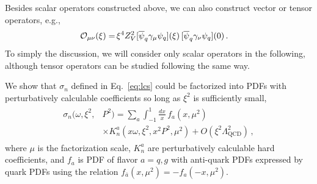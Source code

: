 \documentclass[twocolumn,aps,prl,superscriptaddress,nofootinbib,showpacs]{revtex4-1}
\newcommand{\sect}[1]{\noindent{\it \textbf{#1} ---}}
\begin{document}
Besides scalar operators constructed above, we can also construct vector or tensor operators, e.g.,
\begin{align}\label{eq:operatorsT}
{\cal O}_{\mu\nu}(\xi)=&\,\xi^4Z^{2}_V[\overline{\psi}_q\gamma_\mu{\psi}_{q}](\xi)\,[\overline{\psi}_{q}\gamma_\nu{\psi}_q](0)\,.
\end{align}
To simply the discussion, we will consider only scalar operators in the following, although tensor operators can be studied following the same way.

\sect{Factorization}
We show that ${\sigma}_{n}$ defined in Eq.~\eqref{eq:lcs} could be factorized into PDFs with perturbatively calculable coefficients so long as $\xi^2$ is sufficiently small,
 \begin{align}\label{eq:fac}
\begin{split}
{\sigma}_{n}(\omega,\xi^2,&P^2)=\sum_{a}\int_{-1}^1 \frac{dx}{x}\, f_{a}(x,\mu^2) \\
&\times K_{{n}}^{a}(x\omega,\xi^2,x^2P^2,\mu^2) +O(\xi^2\Lambda_{\text{QCD}}^2)\, ,
 \end{split}
\end{align}
where $\mu$ is the factorization scale, $K_n^{a}$ are perturbatively calculable hard coefficients, and $f_{a}$ is PDF of flavor $a=q,g$ with anti-quark PDFs expressed by quark PDFs using the relation $f_{\bar{a}}(x,\mu^2)=-f_{{a}}(-x,\mu^2)$.
\end{document}
